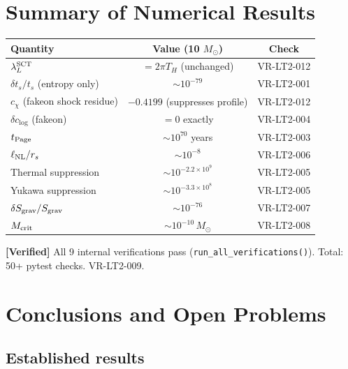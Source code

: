 \documentclass[11pt,a4paper]{article}
\theoremstyle{plain}
\theoremstyle{definition}
\newcommand{\verified}[1]{%
  \par\smallskip\noindent
  \colorbox{green!10}{\parbox{\dimexpr\linewidth-2\fboxsep}{%
    \textcolor{green!50!black}{\textbf{[Verified]}} #1}}%
  \par\smallskip}
\begin{document}
\section{Summary of Numerical Results}
\label{sec:results}

\begin{center}
\begin{tabular}{lcc}
\toprule
\textbf{Quantity} & \textbf{Value (10 $M_\odot$)} & \textbf{Check} \\
\midrule
$\lambda_L^{\rm SCT}$ & $= 2\pi T_H$ (unchanged) & VR-LT2-012 \\
$\delta t_s / t_s$ (entropy only) & $\sim 10^{-79}$ & VR-LT2-001 \\
$c_\chi$ (fakeon shock residue) & $-0.4199$ (suppresses profile) & VR-LT2-012 \\
$\delta c_{\log}$ (fakeon) & $= 0$ exactly & VR-LT2-004 \\
$t_{\rm Page}$ & $\sim 10^{70}$ years & VR-LT2-003 \\
$\ell_{\rm NL}/r_s$ & $\sim 10^{-8}$ & VR-LT2-006 \\
Thermal suppression & $\sim 10^{-2.2\times 10^9}$ & VR-LT2-005 \\
Yukawa suppression & $\sim 10^{-3.3\times 10^8}$ & VR-LT2-005 \\
$\delta S_{\rm grav}/S_{\rm grav}$ & $\sim 10^{-76}$ & VR-LT2-007 \\
$M_{\rm crit}$ & $\sim 10^{-10}\,M_\odot$ & VR-LT2-008 \\
\bottomrule
\end{tabular}
\end{center}

\verified{All 9 internal verifications pass (\texttt{run\_all\_verifications()}).
  Total: 50+ pytest checks.  VR-LT2-009.}


\section{Conclusions and Open Problems}
\label{sec:conclusions}

\subsection{Established results}
\end{document}
